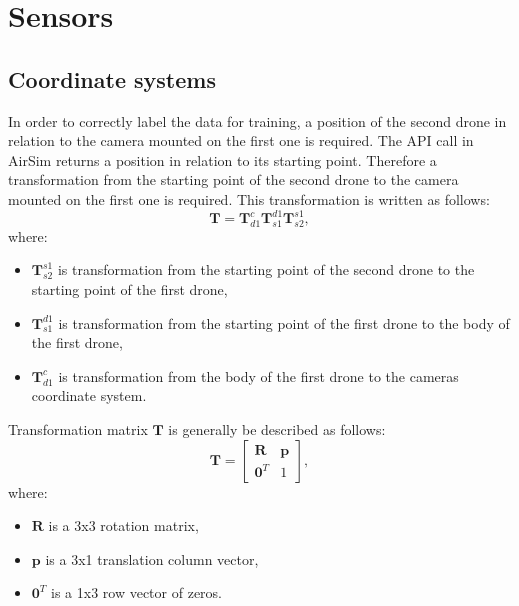 \documentclass[twoside]{ctuthesis}
\theoremstyle{plain}
\theoremstyle{definition}
\theoremstyle{note}
\begin{document}
\chapter{Sensors}
\section{Coordinate systems}
In order to correctly label the data for training, a position of the second drone in relation to the camera mounted on the first one is required. The API call in AirSim returns a position in relation to its starting point. Therefore a transformation from the starting point of the second drone to the camera mounted on the first one is required. This transformation is written as follows:
\begin{equation}
	\textbf{T}=\textbf{T}_{d1}^{c}\textbf{T}_{s1}^{d1}\textbf{T}_{s2}^{s1},
\end{equation}
where:
\begin{itemize}
	\item $\textbf{T}_{s2}^{s1}$ is transformation from the starting point of the second drone to the starting point of the first drone,
	\item $\textbf{T}_{s1}^{d1}$ is transformation from the starting point of the first drone to the body of the first drone,
	\item $\textbf{T}_{d1}^{c}$ is transformation from the body of the first drone to the cameras coordinate system.
\end{itemize}
Transformation matrix $\textbf{T}$ is generally be described as follows:
\begin{equation}
	\textbf{T}=\begin{bmatrix}
		\textbf{R} & \textbf{p}\\
		\textbf{0}^T & 1
	\end{bmatrix},
\end{equation}
where:
\begin{itemize}
	\item $\textbf{R}$ is a 3x3 rotation matrix,
	\item $\textbf{p}$ is a 3x1 translation column vector,
	\item $\textbf{0}^T$ is a 1x3 row vector of zeros.
\end{itemize}
\end{document}
